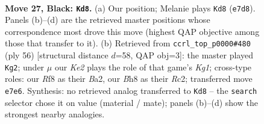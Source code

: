 \documentclass[11pt]{article}
\begin{document}
\clearpage

\begin{figure}[p]\centering
\begin{subfigure}{0.46\textwidth}\centering
\resizebox{\linewidth}{!}{%
\newchessgame
\chessboard[
  setfen={r4r1b/1ppbk3/p2n4/3Npp2/7R/PB3N2/1P2KPP1/R1B5 b - - 6 27},
  showmover=false,
  pgfstyle=straightmove, color=movearrow, markmove={e7-d8}
]}
\caption{}
\end{subfigure}\hfill
\begin{subfigure}{0.46\textwidth}\centering
\resizebox{\linewidth}{!}{%
\newchessgame
\chessboard[
  setfen={r4bk1/1n2pp2/5np1/3P3p/1r6/1PN1B1PP/B1R2P2/2R3K1 w - - 0 29},
  showmover=false,
  pgfstyle=straightmove, color=movearrow, markmove={g1-g2}
]}
\caption{}
\end{subfigure}
\\[4pt]

\caption{\textbf{Move 27, Black: \texttt{Kd8}.} (a) Our position; Melanie plays \texttt{Kd8} (\texttt{e7d8}). Panels (b)--(d) are the retrieved master positions whose correspondence most drove this move (highest QAP objective among those that transfer to it). (b) Retrieved from \texttt{ccrl\_top\_p0000\#480} (ply 56) [structural distance $d$=58, QAP obj=3]: the master played \texttt{Kg2}; under $\mu$ our \emph{Ke2} plays the role of that game's \emph{Kg1}; cross-type roles: our \emph{R}f8 as their \emph{B}a2, our \emph{B}h8 as their \emph{R}c2; transferred move \texttt{e7e6}. Synthesis: no retrieved analog transferred to \texttt{Kd8} -- the \texttt{search} selector chose it on value (material / mate); panels (b)--(d) show the strongest nearby analogies.}
\label{fig:thought-m53}
\end{figure}

\clearpage
\end{document}
